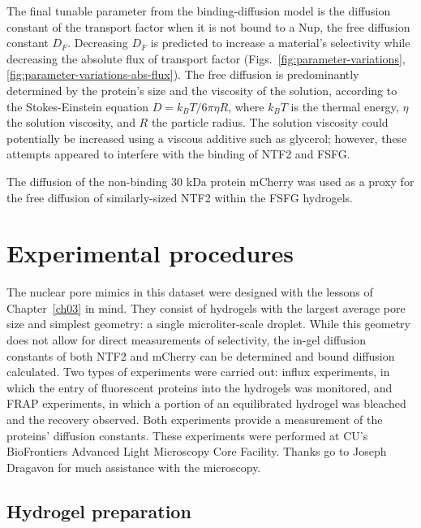 The final tunable parameter from the binding-diffusion model is the diffusion constant of the transport factor when it is not bound to a Nup, the free diffusion constant $D_F$.  Decreasing $D_F$ is predicted to increase a material's selectivity while decreasing the absolute flux of transport factor (Figs.~\ref{fig:parameter-variations}, \ref{fig:parameter-variations-abs-flux}).  The free diffusion is predominantly determined by the protein's size and the viscosity of the solution, according to the Stokes-Einstein equation $D = k_BT/6\pi\eta R$, where $k_BT$ is the thermal energy, $\eta$ the solution viscosity, and $R$ the particle radius.  The solution viscosity could potentially be increased using a viscous additive such as glycerol; however, these attempts appeared to interfere with the binding of NTF2 and FSFG.

The diffusion of the non-binding 30 kDa protein mCherry was used as a proxy for the free diffusion of similarly-sized NTF2 within the FSFG hydrogels.

\section{Experimental procedures}

The nuclear pore mimics in this dataset were designed with the lessons of Chapter~\ref{ch03} in mind.  They consist of hydrogels with the largest average pore size and simplest geometry: a single microliter-scale droplet.  While this geometry does not allow for direct measurements of selectivity, the in-gel diffusion constants of both NTF2 and mCherry can be determined and bound diffusion calculated.  Two types of experiments were carried out: influx experiments, in which the entry of fluorescent proteins into the hydrogels was monitored, and FRAP experiments, in which a portion of an equilibrated hydrogel was bleached and the recovery observed.  Both experiments provide a measurement of the proteins' diffusion constants.  These experiments were performed at CU's BioFrontiers Advanced Light Microscopy Core Facility.  Thanks go to Joseph Dragavon for much assistance with the microscopy.

\subsection{Hydrogel preparation}

